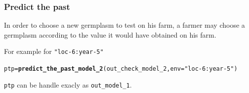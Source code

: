 \documentclass{book}\usepackage[]{graphicx}\usepackage[]{color}
\makeatletter
\newcommand{\hlstr}[1]{\textcolor[rgb]{0.192,0.494,0.8}{#1}}%
\newcommand{\hlstd}[1]{\textcolor[rgb]{0.345,0.345,0.345}{#1}}%
\newcommand{\hlkwb}[1]{\textcolor[rgb]{0.69,0.353,0.396}{#1}}%
\newcommand{\hlkwc}[1]{\textcolor[rgb]{0.333,0.667,0.333}{#1}}%
\newcommand{\hlkwd}[1]{\textcolor[rgb]{0.737,0.353,0.396}{\textbf{#1}}}%
\newenvironment{kframe}{%
 \def\at@end@of@kframe{}%
 \ifinner\ifhmode%
  \def\at@end@of@kframe{\end{minipage}}%
  \begin{minipage}{\columnwidth}%
 \fi\fi%
 \def\FrameCommand##1{\hskip\@totalleftmargin \hskip-\fboxsep
 \colorbox{shadecolor}{##1}\hskip-\fboxsep
     \hskip-\linewidth \hskip-\@totalleftmargin \hskip\columnwidth}%
 \MakeFramed {\advance\hsize-\width
   \@totalleftmargin\z@ \linewidth\hsize
   \@setminipage}}%
 {\par\unskip\endMakeFramed%
 \at@end@of@kframe}
\newenvironment{knitrout}{}{} %
\makeatother
\begin{document}
\subsubsection{Predict the past}

In order to choose a new germplasm to test on his farm, a farmer may choose a germplasm according to the value it would have obtained on his farm.

For example for \texttt{"loc-6:year-5"}
\begin{knitrout}
\color{fgcolor}\begin{kframe}
\begin{alltt}
\hlstd{ptp} \hlkwb{=} \hlkwd{predict_the_past_model_2}\hlstd{(out_check_model_2,} \hlkwc{env} \hlstd{=} \hlstr{"loc-6:year-5"}\hlstd{)}
\end{alltt}


{\ttfamily\noindent\bfseries{}}\end{kframe}
\end{knitrout}

\texttt{ptp} can be handle exacly as \texttt{out\_model\_1}.
\end{document}
